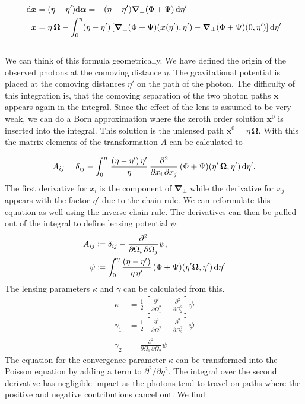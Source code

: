 \documentclass[../main.tex]{subfiles}
\begin{document}
\begin{align}
    \mathrm{d} \boldsymbol{x} &= (\eta-\eta') \mathrm{d} \boldsymbol{\alpha} = - (\eta-\eta') \boldsymbol{\nabla}_\perp (\Phi+\Psi)\, \mathrm{d} \eta'\\
    \boldsymbol{x} &= \eta\,\boldsymbol{\Omega} - \int_0^\eta (\eta-\eta') \left[\boldsymbol{\nabla}_\perp (\Phi+\Psi)(\boldsymbol{x}(\eta'),\eta')-\boldsymbol{\nabla}_\perp (\Phi+\Psi)(0,\eta')\right] \mathrm{d} \eta'
\end{align}  \\
We can think of this formula geometrically. We have defined the origin of the observed photons at the comoving distance $\eta$. The gravitational potential is placed at the comoving distances $\eta'$ on the path of the photon. The difficulty of this integration is, that the comoving separation of the two photon paths $\boldsymbol{x}$ appears again in the integral. Since the effect of the lens is assumed to be very weak, we can do a Born approximation where the zeroth order solution $\boldsymbol{x}^0$ is inserted into the integral. This solution is the unlensed path $\boldsymbol{x}^0=\eta\,\boldsymbol{\Omega}$. With this the matrix elements of the transformation $A$ can be calculated to 

\begin{equation}
    A_{ij} = \delta_{ij} - \int_0^\eta \, \frac{(\eta-\eta')\,\eta'}{\eta} \, \frac{\partial^2}{\partial x_i \, \partial x_j} \, (\Phi+\Psi)(\eta' \, \boldsymbol{\Omega},\eta')\, \mathrm{d} \eta'.
\end{equation} 
The first derivative for $x_i$ is the component of $\boldsymbol{\nabla}_\perp$ while the derivative for $x_j$ appears with the factor $\eta'$ due to the chain rule. We can reformulate this equation as well using the inverse chain rule. The derivatives can then be pulled out of the integral to define lensing potential $\psi$.\begin{align}
    A_{ij} &\coloneqq \delta_{ij} - \frac{\partial^2}{\partial \Omega_i \, \partial \Omega_j} \psi,\\
    \psi &\coloneqq \int_0^\eta \frac{(\eta-\eta')}{\eta\,\eta'}\, (\Phi+\Psi)(\eta' \boldsymbol{\Omega},\eta') \, \mathrm{d} \eta'
\end{align}
The lensing parameters $\kappa$ and $\gamma$ can be calculated from this. \begin{align}
    \kappa &= \frac{1}{2} \, \left[\frac{\partial^2}{\partial \Omega_1^2}+\frac{\partial^2}{\partial \Omega_2^2}\right]  \psi \nonumber \\
    \gamma_1&= \frac{1}{2} \, \left[\frac{\partial^2}{\partial \Omega_1^2}-\frac{\partial^2}{\partial \Omega_2^2}\right]  \psi \\
    \gamma_2& = \frac{\partial^2}{\partial \Omega_1\,\partial\Omega_2} \psi \nonumber
\end{align}
The equation for the convergence parameter $\kappa$ can be transformed into the Poisson equation by adding a term to $\partial^2/\partial\eta^2$. The integral over the second derivative has negligible impact as the photons tend to travel on paths where the positive and negative contributions cancel out. We find 
\end{document}
